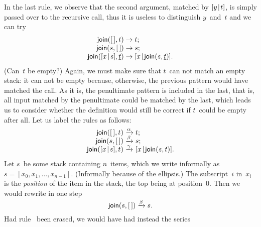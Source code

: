 In the last rule, we observe that the second argument, matched by
\([{y}\!\mid\!{t}]\), is simply passed over to the recursive call, thus it
is useless to distinguish \(y\)~and~\(t\) and we can try
\begin{equation*}
\begin{array}{r@{\;}l@{\;}l}
\fun{join}(\el,t) & \rightarrow & t;\\
\fun{join}(s,\el) & \rightarrow & s;\\
\fun{join}(\cons{x}{s},\underline{t}) & \rightarrow &
\cons{x}{\fun{join}(s,\underline{t})}.
\end{array}
\end{equation*}
(Can~\(t\) be empty?) Again, we must make sure that \(t\)~can not
match an empty stack: it can not be empty because, otherwise, the
previous pattern would have matched the call. As it is, the
penultimate pattern is included in the last, that is, all input
matched by the penultimate could be matched by the last, which leads
us to consider whether the definition would still be correct if
\(t\)~could be empty after all. Let us label the rules as follows:
\begin{equation*}
\begin{array}{r@{\;}l@{\;}l}
\fun{join}(\el,t) & \smashedrightarrow{\alpha} & t;\\
\fun{join}(s,\el) & \smashedrightarrow{\beta} & s;\\
\fun{join}(\cons{x}{s},t) & \smashedrightarrow{\gamma} &
\cons{x}{\fun{join}(s,t)}.
\end{array}
\end{equation*}
Let \(s\)~be some stack containing \(n\)~items, which we write
informally as \(s = [x_0, x_1, \dots, x_{n-1}]\). (Informally because
of the ellipsis.) The subscript~\(i\) in~\(x_i\) is the
\emph{position} of the item in the stack, the top being at
position~\(0\). Then we would rewrite in one step
\begin{equation*}
\textsf{join}(s,[\,]) \xrightarrow{\smash{\beta}} s.
\end{equation*}
Had rule~\clause{\beta} been erased, we would have had instead the
series

